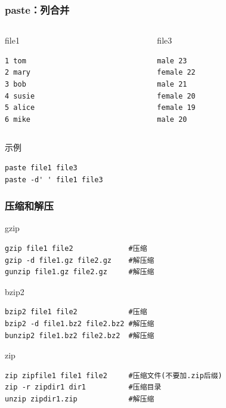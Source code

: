 \documentclass[xcolor=svgnames,presentation]{beamer}
\begin{document}
\begin{frame}[fragile]
\frametitle{paste：列合并}
\label{sec-3-1-5}
\label{sec-3-1-5-1}
\begin{columns}
\begin{column}{0.5\textwidth}
\begin{exampleblock}{file1}
\label{sec-3-1-5-1-1}


\begin{verbatim}
1 tom
2 mary
3 bob
4 susie
5 alice
6 mike
\end{verbatim}
\end{exampleblock}
\end{column}
\begin{column}{0.5\textwidth}
\begin{exampleblock}{file3}
\label{sec-3-1-5-1-2}


\begin{verbatim}
male 23
female 22
male 21
female 20
female 19
male 20
\end{verbatim}
\end{exampleblock}
\end{column}
\end{columns}
\label{sec-3-1-5-2}
\begin{block}{示例}
\label{sec-3-1-5-2-1}


\begin{verbatim}
paste file1 file3
paste -d' ' file1 file3
\end{verbatim}
\end{block}
\end{frame}
\begin{frame}[fragile]
\frametitle{压缩和解压}
\label{sec-3-1-6}
\begin{exampleblock}{gzip}
\label{sec-3-1-6-1}


\begin{verbatim}
gzip file1 file2             #压缩
gzip -d file1.gz file2.gz    #解压缩
gunzip file1.gz file2.gz     #解压缩
\end{verbatim}
\end{exampleblock}
\begin{block}{bzip2}
\label{sec-3-1-6-2}


\begin{verbatim}
bzip2 file1 file2            #压缩
bzip2 -d file1.bz2 file2.bz2 #解压缩
bunzip2 file1.bz2 file2.bz2  #解压缩
\end{verbatim}
\end{block}
\begin{exampleblock}{zip}
\label{sec-3-1-6-3}


\begin{verbatim}
zip zipfile1 file1 file2     #压缩文件(不要加.zip后缀)
zip -r zipdir1 dir1          #压缩目录
unzip zipdir1.zip            #解压缩
\end{verbatim}
\end{exampleblock}
\end{frame}
\end{document}
